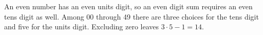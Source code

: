 An even number has an even units digit, so an even digit sum requires an even tens digit as well. Among 00 through 49 there are three choices for the tens digit and five for the units digit. Excluding zero leaves $3\cdot5-1=\boxed{14}$.
